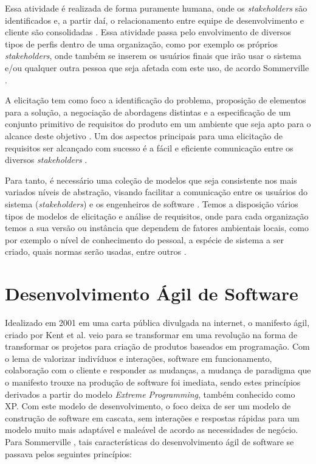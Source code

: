 Essa atividade é realizada de forma puramente humana, onde os \textit{stakeholders} são identificados e, a partir daí, o relacionamento entre equipe de desenvolvimento e cliente são consolidadas \cite{SWEBOK2014}. Essa atividade passa pelo envolvimento de diversos tipos de perfis dentro de uma organização, como por exemplo os próprios \textit{stakeholders}, onde também se inserem os usuários finais que irão usar o sistema e/ou qualquer outra pessoa que seja afetada com este uso, de acordo Sommerville \cite{Sommerville07}.

A elicitação tem como foco a identificação do problema, proposição de elementos para a solução, a negociação de abordagens distintas e a especificação de um conjunto primitivo de requisitos do produto em um ambiente que seja apto para o alcance deste objetivo \cite{pressman}. Um dos aspectos principais para uma elicitação de requisitos ser alcançado com sucesso é a fácil e eficiente comunicação entre os diversos \textit{stakeholders} \cite{SWEBOK2014}.

Para tanto, é necessário uma coleção de modelos que seja consistente nos mais variados níveis de abstração, visando facilitar a comunicação entre os usuários do sistema (\textit{stakeholders}) e os engenheiros de software \cite{SWEBOK2014}. Temos a disposição vários tipos de modelos de elicitação e análise de requisitos, onde para cada organização temos a sua versão ou instância que dependem de fatores ambientais locais, como por exemplo o nível de conhecimento do pessoal, a espécie de sistema a ser criado, quais normas serão usadas, entre outros \cite{Sommerville07}. 
 
\section{Desenvolvimento Ágil de Software}

Idealizado em 2001 em uma carta pública divulgada na internet, o manifesto ágil, criado por Kent et al. \cite{agilemanifesto} veio para se transformar em uma revolução na forma de transformar os projetos para criação de produtos baseados em programação. Com o lema de valorizar indivíduos e interações, software em funcionamento, colaboração com o cliente e responder as mudanças, a mudança de paradigma que o manifesto trouxe na produção de software foi imediata, sendo estes princípios derivados a partir do modelo \textit{Extreme Programming}, também conhecido como \acrshort{XP}. Com este modelo de desenvolvimento, o foco deixa de ser um modelo de construção de software em cascata, sem interações e respostas rápidas para um modelo muito mais adaptável e maleável de acordo as necessidades de negócio. Para Sommerville \cite{Sommerville07}, tais características do desenvolvimento ágil de software se passava pelos seguintes princípios:

